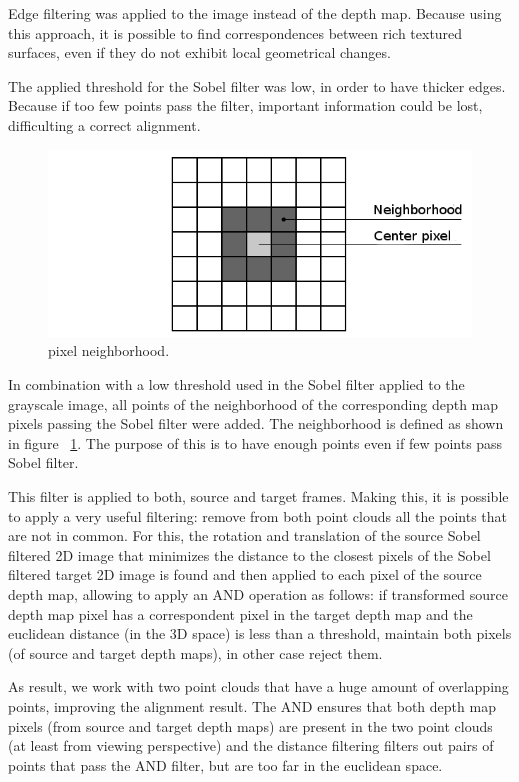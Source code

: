 Edge filtering was applied
to the image instead of the depth map. Because using this approach, it is possible to find correspondences between rich textured 
surfaces, even if they do not exhibit local geometrical changes.

The applied threshold for the Sobel filter was low, in order to have thicker edges. Because if too few points pass the filter, important information 
could be lost, difficulting a correct alignment.


\begin{figure}
\begin{center}
\includegraphics[scale=0.4]{images/vecindario}
\end{center}
\caption{pixel neighborhood.}
\label{fig:neighbor}
\end{figure}

In combination with a low threshold used in the Sobel filter applied to the grayscale image, all points of the neighborhood of the corresponding depth map pixels passing the Sobel filter were added. 
The neighborhood is defined as shown in figure ~\ref{fig:neighbor}. The purpose of this is to have enough points even if few points
 pass Sobel filter.

This filter is applied to both, source and target frames. Making this, it is possible to apply a very useful filtering: remove 
from both point clouds all the points that are not in common. For this, the rotation and translation 
of the source Sobel filtered 2D image that minimizes the distance to the closest pixels of the Sobel filtered target 2D image is found and 
then applied to each pixel of the source depth map, 
allowing to apply an AND operation as follows: if transformed source depth map pixel has a correspondent pixel in the target depth map and 
the euclidean distance (in the 3D space) is less than a threshold, maintain both pixels (of source and target depth maps), in other case reject them. 

 As result, we work with two point clouds that have a huge amount of overlapping points, improving the alignment 
result. The AND ensures that both depth map pixels (from source and target depth maps) are present in the two point clouds (at least from viewing 
perspective) and the distance filtering filters out pairs of points that pass the AND filter, but are too far in the euclidean space.

